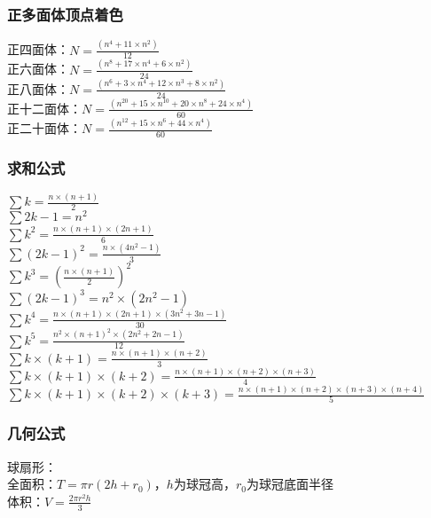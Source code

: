 	\subsubsection{正多面体顶点着色}
	正四面体：$N = \frac{(n^{4}+11\times n^{2})}{12}$\\
	正六面体：$N = \frac{(n^{8}+17\times n^{4}+6\times n^{2})}{24}$\\
	正八面体：$N = \frac{(n^{6}+3\times n^{4}+12\times n^{3}+8\times n^{2})}{24}$\\
	正十二面体：$N = \frac{(n^{20}+15\times n^{10}+20\times n^{8}+24\times n^{4})}{60}$\\
	正二十面体：$N = \frac{(n^{12}+15\times n^{6}+44\times n^{4})}{60}$\\
	
	\subsubsection{求和公式}
	$\sum{k} = \frac{n\times (n+1)}{2}$\\
	$\sum{2k-1} = n^{2}$\\
	$\sum{k^{2}} = \frac{n\times (n+1)\times (2n+1)}{6}$\\
	$\sum{(2k-1)^{2}} = \frac{n\times (4n^{2}-1)}{3}$\\
	$\sum{k^{3}} = (\frac{n\times (n+1)}{2})^{2}$\\
	$\sum{(2k-1)^{3}} = n^{2}\times (2n^{2}-1)$\\
	$\sum{k^{4}} = \frac{n\times (n+1)\times (2n+1)\times (3n^{2}+3n-1)}{30}$\\
	$\sum{k^{5}} = \frac{n^{2}\times (n+1)^{2}\times (2n^{2}+2n-1)}{12}$\\
	$\sum{k\times (k+1)} = \frac{n\times (n+1)\times (n+2)}{3}$\\
	$\sum{k\times (k+1)\times (k+2)} = \frac{n\times (n+1)\times (n+2)\times (n+3)}{4}$\\
	$\sum{k\times (k+1)\times (k+2)\times (k+3)} = \frac{n\times (n+1)\times (n+2)\times (n+3)\times (n+4)}{5}$\\
	
	\subsubsection{几何公式}
	球扇形：\\
	全面积：$T = \pi r(2h+r_0)$，$h$为球冠高，$r_0$为球冠底面半径\\
	体积：$V = \frac{2\pi r^{2}h}{3}$\\
	
